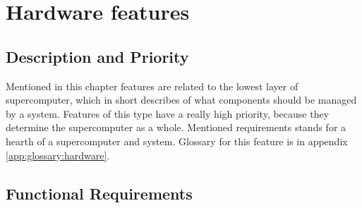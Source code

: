 \documentclass{report}
\begin{document}
\section{Hardware features}

\subsection{Description and Priority}

Mentioned in this chapter features are related to the lowest layer of supercomputer, which in short describes of what components should be managed by a system. Features of this type have a really high priority, because they determine the supercomputer as a whole. Mentioned requirements stands for a hearth of a supercomputer and system. Glossary for this feature is in appendix \ref{app:glossary:hardware}.


\subsection{Functional Requirements}
\end{document}

